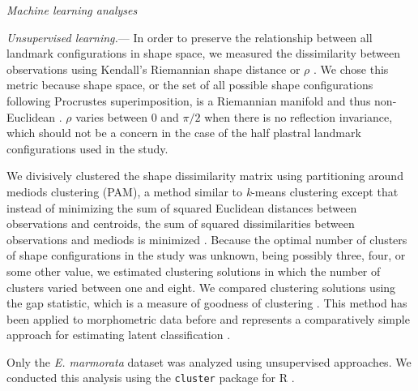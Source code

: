 \documentclass[12pt,letterpaper]{article}
\renewcommand{\subsection}[1]{%
\bigskip
\begin{center}
\begin{large}
\normalfont\itshape #1
\end{large}
\end{center}}
\renewcommand{\subsubsection}[1]{%
\vspace{2ex}
\noindent
\textit{#1.}---}
\begin{document}
\subsection{Machine learning analyses}
\subsubsection{Unsupervised learning}
In order to preserve the relationship between all landmark configurations in shape space, we measured the dissimilarity between observations using Kendall's Riemannian shape distance or \(\rho\) \citep{Kendall1984a,Dryden1998a}. We chose this metric because shape space, or the set of all possible shape configurations following Procrustes superimposition, is a Riemannian manifold and thus non-Euclidean \citep{Dryden1998a}. \(\rho\) varies between 0 and \(\pi / 2\) when there is no reflection invariance, which should not be a concern in the case of the half plastral landmark configurations used in the study.

We divisively clustered the shape dissimilarity matrix using partitioning around mediods clustering (PAM), a method similar to \textit{k}-means clustering except that instead of minimizing the sum of squared Euclidean distances between observations and centroids, the sum of squared dissimilarities between observations and mediods is minimized \citep{Kaufman1990}. Because the optimal number of clusters of shape configurations in the study was unknown, being possibly three, four, or some other value, we estimated clustering solutions in which the number of clusters varied between one and eight. We compared clustering solutions using the gap statistic, which is a measure of goodness of clustering \citep{Tibshirani2001a}. This method has been applied to morphometric data before and represents a comparatively simple approach for estimating latent classification \citep{Claude2008}.

Only the \textit{E. marmorata} dataset was analyzed using unsupervised approaches. We conducted this analysis using the \texttt{cluster} package for R \citep{Maechler2013}.
\end{document}
